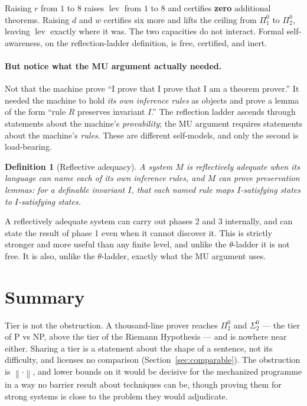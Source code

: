 \documentclass[11pt,a4paper]{article}
\newtheorem{definition}{Definition}
\newcommand{\Sig}[2]{\Sigma^{#1}_{#2}}
\newcommand{\Pai}[2]{\Pi^{#1}_{#2}}
\newcommand{\shortest}[1]{\left\lVert #1 \right\rVert}
\newcommand{\lev}{\operatorname{lev}}
\begin{document}
Raising $r$ from $1$ to $8$ raises $\lev$ from $1$ to $8$ and certifies
\textbf{zero} additional theorems. Raising $d$ and $w$ certifies six more and
lifts the ceiling from $\Pai{0}{1}$ to $\Pai{0}{2}$, leaving $\lev$ exactly
where it was. The two capacities do not interact. Formal self-awareness, on the
reflection-ladder definition, is free, certified, and inert.

\paragraph{But notice what the MU argument actually needed.} Not that the
machine prove ``I prove that I prove that I am a theorem prover.'' It needed
the machine to hold \emph{its own inference rules} as objects and prove a lemma
of the form ``rule $R$ preserves invariant $I$.'' The reflection ladder ascends
through statements about the machine's \emph{provability}; the MU argument
requires statements about the machine's \emph{rules}. These are different
self-models, and only the second is load-bearing.

\begin{definition}[Reflective adequacy]
A system $M$ is \emph{reflectively adequate} when its language can name each of
its own inference rules, and $M$ can prove preservation lemmas: for a definable
invariant $I$, that each named rule maps $I$-satisfying states to
$I$-satisfying states.
\end{definition}

A reflectively adequate system can carry out phases 2 and 3 internally, and can
state the result of phase 1 even when it cannot discover it. This is strictly
stronger and more useful than any finite level, and unlike the $\theta$-ladder
it is not free. It is also, unlike the $\theta$-ladder, exactly what the MU
argument uses.

\section{Summary}

Tier is not the obstruction. A thousand-line prover reaches $\Pai{0}{2}$ and
$\Sig{0}{2}$ --- the tier of P vs NP, above the tier of the Riemann Hypothesis
--- and is nowhere near either. Sharing a tier is a statement about the shape of
a sentence, not its difficulty, and licenses no comparison
(Section~\ref{sec:comparable}). The obstruction is $\shortest{\cdot}$, and
lower bounds on it would be decisive for the mechanized programme in a way no
barrier result about techniques can be, though proving them for strong systems
is close to the problem they would adjudicate.
\end{document}
